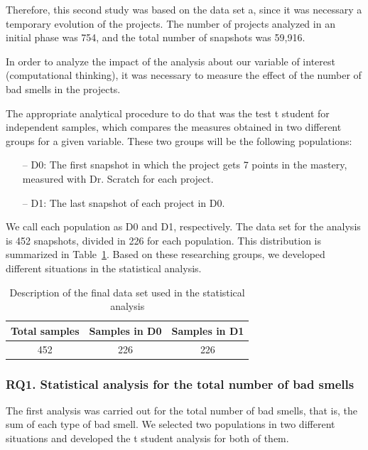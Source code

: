 Therefore, this second study was based on the data set a, since it was necessary a temporary evolution of the projects. The number of projects analyzed in an initial phase was 754, and the total number of snapshots was 59,916.

In order to analyze the impact of the analysis about our variable of interest (computational thinking), it was necessary to measure the effect of the number of bad smells in the projects.

The appropriate analytical procedure to do that was the test t student for independent samples, which compares the measures obtained in two different groups for a given variable. These two groups will be the following populations:

\begin{itemize}
    \item[--] D0: The first snapshot in which the project gets 7 points in the mastery, measured with Dr. Scratch for each project. 
    \item[--] D1: The last snapshot of each project in D0.
\end{itemize}

We call each population as D0 and D1, respectively. The data set for the analysis is 452 snapshots, divided in 226 for each population. This distribution is summarized in Table~\ref{table:statistical_analysis_distribution}. Based on these researching groups, we developed different situations in the statistical analysis.

\begin{table}
    \centering
    \begin{tabular}{|c|c|c|}
        \hline
        \textbf{Total samples} & \textbf{Samples in D0} & \textbf{Samples in D1} \\ \hline
        452 & 226 & 226 \\ \hline
    \end{tabular}
    \caption{Description of the final data set used in the statistical analysis}
    \label{table:statistical_analysis_distribution}
\end{table}

\subsubsection{RQ1. Statistical analysis for the total number of bad smells}
\label{subsubsec:RQ1_statistical}

The first analysis was carried out for the total number of bad smells, that is, the sum of each type of bad smell. We selected two populations in two different situations and developed the t student analysis for both of them.


